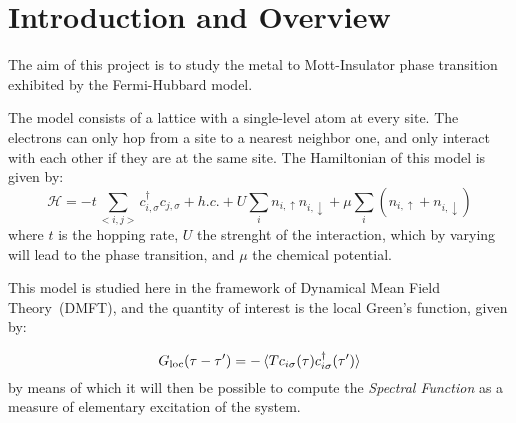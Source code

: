 
\section{Introduction and Overview}

The aim of this project is to study the metal to Mott-Insulator phase transition exhibited by the Fermi-Hubbard model.

The model consists of a lattice with a single-level atom at every site. The electrons can only hop from a site to a nearest neighbor one, and only interact with each other if they are at the same site. The Hamiltonian of this model is given by:
%
\begin{equation}
\mathcal{H} = -t\sum_{<i,j>}c_{i,\sigma}^\dagger c_{j,\sigma} + h.c.+ U\sum_i n_{i,\uparrow}n_{i,\downarrow} + \mu\sum_i (n_{i,\uparrow} + n_{i,\downarrow})
\end{equation}
%
where $t$ is the hopping rate, $U$ the strenght of the interaction, which by varying will lead to the phase transition, and $\mu$ the chemical potential.

This model is studied here in the framework of Dynamical Mean Field Theory~(DMFT), and the quantity of interest is the local Green's function, given by:

\begin{equation}\label{orGreen's}
G_{\text{loc}} (\tau - \tau^\prime) = -\braket{Tc_{i\sigma}(\tau)c_{i\sigma}^\dagger(\tau^\prime)} 
\end{equation}
by means of which it will then be possible to compute the \emph{Spectral Function} as a measure of elementary excitation of the system.

